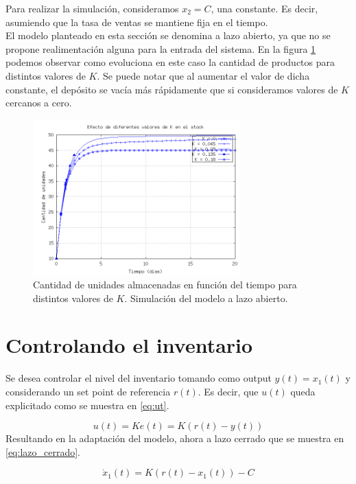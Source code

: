 \documentclass{sig-alternate}
\begin{document}
Para realizar la simulación, consideramos $x_{2} = C$, una constante. Es decir, asumiendo que la tasa de ventas se mantiene fija en el tiempo.\\
El modelo planteado en esta sección se denomina a lazo abierto, ya que no se propone realimentación alguna para la entrada del sistema. 
En la figura \ref{fig:lazo_abierto} podemos observar como evoluciona en este caso la cantidad de productos para distintos valores de $K$. 
Se puede notar que al aumentar el valor de dicha constante, el depósito se vacía más rápidamente que si consideramos valores de $K$ cercanos a
cero.

\begin{figure}[h]
\begin{center}
\includegraphics[width=8cm]{../src/k_plot.png}
\caption{\label{fig:lazo_abierto}Cantidad de unidades almacenadas en función del tiempo para distintos valores de $K$. Simulación del modelo a lazo abierto.}
\end{center}
\end{figure}

\section{Controlando el inventario}
\label{inventary_control_section} 
Se desea controlar el nivel del inventario tomando como output $y(t)=x_{1}(t)$ y considerando
un set point de referencia $r(t)$. Es decir, que $u(t)$ queda explicitado como se muestra en \eqref{eq:ut}.

\begin{equation}
u(t)= Ke(t) = K(r(t)-y(t))\label{eq:ut}\end{equation}
Resultando en la adaptación del modelo, ahora a lazo cerrado que se muestra en \eqref{eq:lazo_cerrado}.

\begin{equation}
\dot{x}_1(t) = K(r(t) - x_{1}(t)) - C\label{eq:lazo_cerrado}\end{equation}
\end{document}
